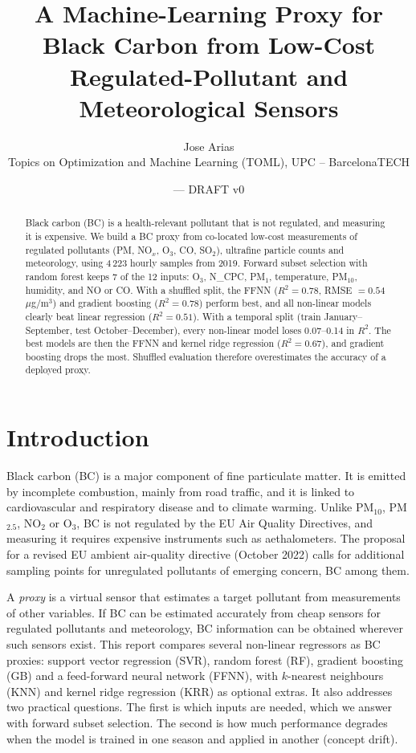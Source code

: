 \documentclass[11pt,a4paper]{article}
\title{A Machine-Learning Proxy for Black Carbon from Low-Cost Regulated-Pollutant and Meteorological Sensors}
\author{Jose Arias\\ \small Topics on Optimization and Machine Learning (TOML), UPC -- BarcelonaTECH}
\date{\todo{date} \quad --- \quad DRAFT v0}
\newcommand{\ugm}{$\mu$g/m$^3$}
\begin{document}
\maketitle

\begin{abstract}
Black carbon (BC) is a health-relevant pollutant that is not regulated, and measuring it is expensive. We build a BC proxy from co-located low-cost measurements of regulated pollutants (PM, NO$_x$, O$_3$, CO, SO$_2$), ultrafine particle counts and meteorology, using 4\,223 hourly samples from 2019. Forward subset selection with random forest keeps 7 of the 12 inputs: O$_3$, N\_CPC, PM$_1$, temperature, PM$_{10}$, humidity, and NO or CO. With a shuffled split, the FFNN ($R^2=0.78$, RMSE $=0.54$~\ugm) and gradient boosting ($R^2=0.78$) perform best, and all non-linear models clearly beat linear regression ($R^2=0.51$). With a temporal split (train January--September, test October--December), every non-linear model loses 0.07--0.14 in $R^2$. The best models are then the FFNN and kernel ridge regression ($R^2=0.67$), and gradient boosting drops the most. Shuffled evaluation therefore overestimates the accuracy of a deployed proxy.
\end{abstract}

\section{Introduction}
Black carbon (BC) is a major component of fine particulate matter. It is emitted by incomplete combustion, mainly from road traffic, and it is linked to cardiovascular and respiratory disease and to climate warming. Unlike PM$_{10}$, PM$_{2.5}$, NO$_2$ or O$_3$, BC is not regulated by the EU Air Quality Directives, and measuring it requires expensive instruments such as aethalometers. The proposal for a revised EU ambient air-quality directive (October 2022) calls for additional sampling points for unregulated pollutants of emerging concern, BC among them.

A \emph{proxy} is a virtual sensor that estimates a target pollutant from measurements of other variables. If BC can be estimated accurately from cheap sensors for regulated pollutants and meteorology, BC information can be obtained wherever such sensors exist. This report compares several non-linear regressors as BC proxies: support vector regression (SVR), random forest (RF), gradient boosting (GB) and a feed-forward neural network (FFNN), with $k$-nearest neighbours (KNN) and kernel ridge regression (KRR) as optional extras. It also addresses two practical questions. The first is which inputs are needed, which we answer with forward subset selection. The second is how much performance degrades when the model is trained in one season and applied in another (concept drift).
\end{document}
